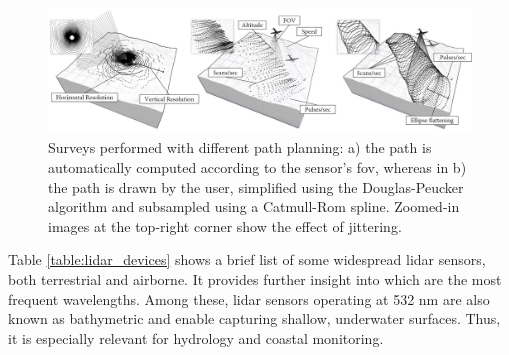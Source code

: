 \begin{figure}[ht]
	\includegraphics[width=\linewidth]{figs/fundamentals/lidar_patterns.png}
	\caption{Surveys performed with different path planning: a) the path is automatically computed according to the sensor's \acrshort{fov}, whereas in b) the path is drawn by the user, simplified using the Douglas-Peucker algorithm and subsampled using a Catmull-Rom spline. Zoomed-in images at the top-right corner show the effect of jittering. }
    \label{fig:lidar_patterns}
\end{figure}

Table \ref{table:lidar_devices} shows a brief list of some widespread \acrshort{lidar} sensors, both terrestrial and airborne. It provides further insight into which are the most frequent wavelengths. Among these, \acrshort{lidar} sensors operating at 532 \si{\nano\meter} are also known as bathymetric and enable capturing shallow, underwater surfaces. Thus, it is especially relevant for hydrology and coastal monitoring.

